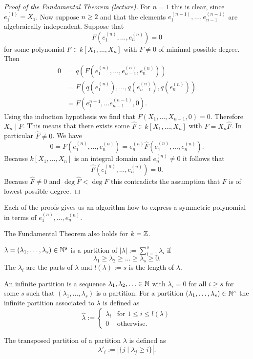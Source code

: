 \begin{proof}[Proof of the Fundamental Theorem (lecture)]
  For $n = 1$ this is clear, since $e^{(1)}_1 = X_1$. Now suppose $n \geq 2$ and that the elements $e^{(n-1)}_1, \ldots, e^{(n-1)}_{n-1}$ are algebraically independent. Suppose that
  \[
   F\left(e^{(n)}_1, \ldots, e^{(n)}_n\right) = 0
  \]
  for some polynomial $F \in k[X_1, \ldots, X_n]$ with $F \neq 0$ of minimal possible degree. Then
  \begin{align*}
   0
   &= q\left(F\left(e^{(n)}_1, \ldots, e^{(n)}_{n-1} ,e^{(n)}_n\right)\right) \\
   &= F\left( q\left(e^{(n)}_1\right), \ldots, q\left(e^{(n)}_{n-1}\right), q\left(e^{(n)}_n\right) \right) \\
   &= F\left( e^{n-1}_1, \ldots e^{(n-1)}_{n-1}, 0 \right).
  \end{align*}
  Using the induction hypothesis we find that $F(X_1, \ldots, X_{n-1}, 0) = 0$. Therefore $X_n \mid F$. This means that there exists some $\hat{F} \in k[X_1, \ldots, X_n]$ with $F = X_n \hat{F}$. In particular $\hat{F} \neq 0$. We have
  \[
   0
   = F\left(e^{(n)}_1, \ldots, e^{(n)}_n\right)
   = e^{(n)}_n \hat{F}\left(e^{(n)}_1, \ldots, e^{(n)}_n\right).
  \]
  Because $k[X_1, \ldots, X_n]$ is an integral domain and $e^{(n)}_n \neq 0$ it follows that
  \[
   \hat{F}\left(e^{(n)}_1, \ldots, e^{(n)}_n\right) = 0.
  \]
  Because $\hat{F} \neq 0$ and $\deg \hat{F} < \deg F$ this contradicts the assumption that $F$ is of lowest possible degree.
\end{proof}


\begin{rem}
 Each of the proofs gives us an algorithm how to express a symmetric polynomial in terms of $e^{(n)}_1, \ldots, e^{(n)}_n$.
\end{rem}


\begin{rem}
 The Fundamental Theorem also holds for $k = \mathbb{Z}$.
\end{rem}


\begin{defi}
 $\lambda = (\lambda_1, \ldots, \lambda_s) \in \mathbb{N}^s$ is a partition of $|\lambda| := \sum_{i=1}^s \lambda_i$ if
 \[
  \lambda_1 \geq \lambda_2 \geq \ldots \geq \lambda_s \geq 0.
 \]
 The $\lambda_i$ are the parts of $\lambda$ and $l(\lambda) := s$ is the length of  $\lambda$.
 
 An infinite partition is a sequence $\lambda_1, \lambda_2, \ldots \in \mathbb{N}$ with $\lambda_i = 0$ for all $i \geq s$ for some $s$ such that $(\lambda_1, \ldots, \lambda_s)$ is a partition. For a partition $(\lambda_1, \ldots, \lambda_s) \in \mathbb{N}^s$ the infinite partition associated to $\lambda$ is defined as
 \[
  \hat{\lambda} :=
  \begin{cases}
   \lambda_i & \text{for } 1 \leq i \leq l(\lambda) \\
           0 & \text{otherwise}.
  \end{cases}
 \]
 
 The transposed partition of a partition $\lambda$ is defined as
 \[
  \lambda'_i := |\{j \mid \lambda_j \geq i\}|.
 \]
\end{defi}


